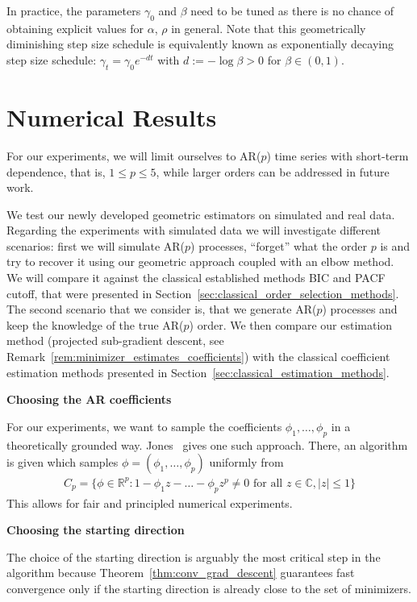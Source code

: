 In practice, the parameters $\gamma_0$ and $\beta$ need to be tuned as there is no chance of obtaining explicit values for $\alpha$, $\rho$ in general. Note that this geometrically diminishing step size schedule is equivalently known as exponentially decaying step size schedule: $\gamma_t=\gamma_0e^{-dt}$ with $d:=-\log{\beta}>0$ for $\beta\in(0,1)$.

\section{Numerical Results}

For our experiments, we will limit ourselves to AR($p$) time series with short-term dependence, that is, $1\le p\le 5$, while larger orders can be addressed in future work.

We test our newly developed geometric estimators on simulated and real data. Regarding the experiments with simulated data we will investigate different scenarios: first we will simulate AR($p$) processes, \enquote{forget} what the order $p$ is and try to recover it using our geometric approach coupled with an elbow method. We will compare it against the classical established methods BIC and PACF cutoff, that were presented in Section~\ref{sec:classical_order_selection_methods}. The second scenario that we consider is, that we generate AR($p$) processes and keep the knowledge of the true AR($p$) order. We then compare our estimation method (projected sub-gradient descent, see Remark~\ref{rem:minimizer_estimates_coefficients}) with the classical coefficient estimation methods presented in Section~\ref{sec:classical_estimation_methods}.

\textbf{Choosing the AR coefficients}

For our experiments, we want to sample the coefficients $\phi_1,\dots,\phi_p$ in a theoretically grounded way. Jones~\cite{jones_randomly_1987} gives one such approach. There, an algorithm is given which samples $\phi=(\phi_1,\dots,\phi_p)$ uniformly from
\begin{align*}
    C_p=\{\phi\in\mathbb{R}^p:1-\phi_1z-\dots-\phi_pz^p\ne0\text{ for all }z\in\mathbb{C},|z|\le 1\}
\end{align*}
This allows for fair and principled numerical experiments.

\textbf{Choosing the starting direction}

The choice of the starting direction is arguably the most critical step in the algorithm because Theorem~\ref{thm:conv_grad_descent} guarantees fast convergence only if the starting direction is already close to the set of minimizers. 

